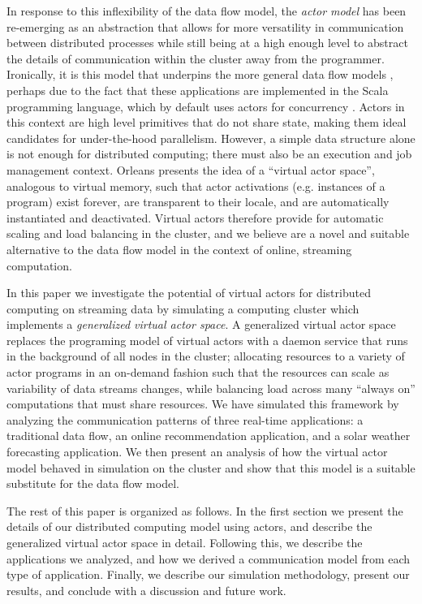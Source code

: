 \documentclass[draftclsnofoot,onecolumn,conference,11pt]{IEEEtran}
\begin{document}
In response to this inflexibility of the data flow model, the \textit{actor model} \cite{hewitt_viewing_1977, agha_actors:_1985} has been re-emerging as an abstraction that allows for more versatility in communication between distributed processes while still being at a high enough level to abstract the details of communication within the cluster away from the programmer. Ironically, it is this model that underpins the more general data flow models \cite{gonzalez_asynchronous_2015}, perhaps due to the fact that these applications are implemented in the Scala programming language, which by default uses actors for concurrency \cite{haller_scala_2009,karmani_actor_2009}. Actors in this context are high level primitives that do not share state, making them ideal candidates for under-the-hood parallelism. However, a simple data structure alone is not enough for distributed computing; there must also be an execution and job management context. Orleans \cite{bernstein_orleans:_2014} presents the idea of a ``virtual actor space'', analogous to virtual memory, such that actor activations (e.g. instances of a program) exist forever, are transparent to their locale, and are automatically instantiated and deactivated. Virtual actors therefore provide for automatic scaling and load balancing in the cluster, and we believe are a novel and suitable alternative to the data flow model in the context of online, streaming computation.

In this paper we investigate the potential of virtual actors for distributed computing on streaming data by simulating a computing cluster which implements a \textit{generalized virtual actor space}. A generalized virtual actor space replaces the programing model of virtual actors with a daemon service that runs in the background of all nodes in the cluster; allocating resources to a variety of actor programs in an on-demand fashion such that the resources can scale as variability of data streams changes, while balancing load across many ``always on'' computations that must share resources. We have simulated this framework by analyzing the communication patterns of three real-time applications: a traditional data flow, an online recommendation application, and a solar weather forecasting application. We then present an analysis of how the virtual actor model behaved in simulation on the cluster and show that this model is a suitable substitute for the data flow model.

The rest of this paper is organized as follows. In the first section we present the details of our distributed computing model using actors, and describe the generalized virtual actor space in detail. Following this, we describe the applications we analyzed, and how we derived a communication model from each type of application. Finally, we describe our simulation methodology, present our results, and conclude with a discussion and future work.
\end{document}

